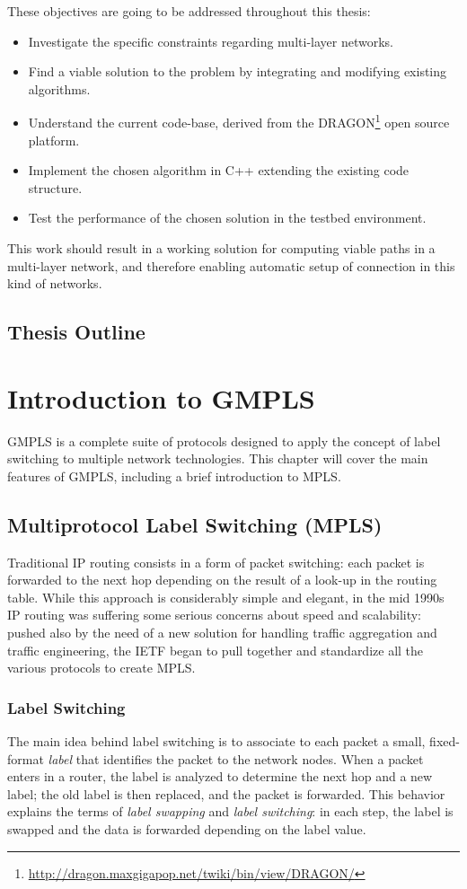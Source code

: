 \documentclass[10pt,a4paper]{report}
\begin{document}
These objectives are going to be addressed throughout this thesis:
\begin{itemize}
\item Investigate the specific constraints regarding multi-layer networks.
\item Find a viable solution to the problem by integrating and
  modifying existing algorithms.
\item Understand the current code-base, derived from the
  DRAGON\footnote{\url{http://dragon.maxgigapop.net/twiki/bin/view/DRAGON/}}
  open source platform.
\item Implement the chosen algorithm in C++ extending the existing
  code structure.
\item Test the performance of the chosen solution in the testbed
  environment.
\end{itemize}

This work should result in a working solution for computing viable
paths in a multi-layer network, and therefore enabling automatic setup
of connection in this kind of networks.

\section{Thesis Outline}

\chapter{Introduction to GMPLS}
GMPLS is a complete suite of protocols designed to apply the concept
of label switching to multiple network technologies. This chapter will
cover the main features of GMPLS, including a brief introduction to
MPLS.

\section{Multiprotocol Label Switching (MPLS)}
Traditional IP routing consists in a form of packet switching: each
packet is forwarded to the next hop depending on the result of a
look-up in the routing table. While this approach is considerably
simple and elegant, in the mid 1990s IP routing was suffering some
serious concerns about speed and scalability: pushed also by the need
of a new solution for handling traffic aggregation and traffic
engineering, the IETF began to pull together and standardize all the
various protocols to create MPLS.

\subsection{Label Switching}
The main idea behind label switching is to associate to each packet a
small, fixed-format \textit{label} that identifies the packet to the
network nodes. When a packet enters in a router, the label is analyzed
to determine the next hop and a new label; the old label is then
replaced, and the packet is forwarded. This behavior explains the
terms of \textit{label swapping} and \textit{label switching}: in each
step, the label is swapped and the data is forwarded depending on the
label value.
\end{document}
